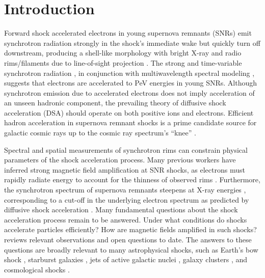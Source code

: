 \documentclass[iop, apj, numberedappendix]{emulateapj}
\begin{document}


\section{Introduction} \label{sec:intro}

Forward shock accelerated electrons in young supernova remnants (SNRs) emit
synchrotron radiation strongly in the shock's immediate wake but quickly turn
off downstream, producing a shell-like morphology with bright X-ray and radio
rims/filaments due to line-of-sight projection \citep{koyama1995}.  The strong
and time-variable synchrotron radiation \citep[e.g.,][]{uchiyama2007,
patnaude2007}, in conjunction with multiwavelength spectral modeling
\citep{aharonian2004, acero2010, ackermann2013}, suggests that electrons are
accelerated to PeV energies in young SNRs.  Although synchrotron emission due
to accelerated electrons does not imply acceleration of an unseen hadronic
component, the prevailing theory of diffusive shock acceleration (DSA) should
operate on both positive ions and electrons.  Efficient hadron acceleration in
supernova remnant shocks is a prime candidate source for galactic cosmic rays
up to the cosmic ray spectrum's ``knee'' \citep{vink2012}.

Spectral and spatial measurements of synchrotron rims can constrain physical
parameters of the shock acceleration process.  Many previous workers have
inferred strong magnetic field amplification at SNR shocks, as electrons must
rapidly radiate energy to account for the thinness of observed rims
\citep{bamba2003, vink2003, parizot2006}.  Furthermore, the synchrotron
spectrum of supernova remnants steepens at X-ray energies \citep{reynolds1999},
corresponding to a cut-off in the underlying electron spectrum as predicted by
diffusive shock acceleration \citep{webb1984}.  Many fundamental questions
about the shock acceleration process remain to be answered.  Under what
conditions do shocks accelerate particles efficiently?  How are magnetic fields
amplified in such shocks?  \citet{reynolds2008} reviews relevant observations
and open questions to date.  The answers to these questions are broadly
relevant to many astrophysical shocks, such as Earth's bow shock
\citep{ellison1990}, starburst galaxies \citep{heckman1990}, jets of active
galactic nuclei \citep{chen2014}, galaxy clusters \citep{van-weeren2010}, and
cosmological shocks \citep{ryu2008}.
\end{document}

